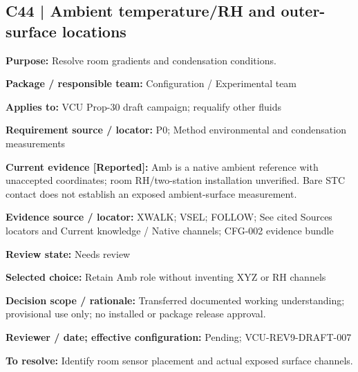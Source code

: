\documentclass[11pt]{article}
\begin{document}
\par\noindent\begin{minipage}{\textwidth}\small\setlength{\parskip}{2pt}
\subsection*{C44 | Ambient temperature/RH and outer-surface locations}
\textbf{Purpose:} Resolve room gradients and condensation conditions.\par
\textbf{Package / responsible team:} Configuration / Experimental team\par
\textbf{Applies to:} VCU Prop-30 draft campaign; requalify other fluids\par
\textbf{Requirement source / locator:} P0; Method environmental and condensation measurements\par
\textbf{Current evidence [Reported]:} Amb is a native ambient reference with unaccepted coordinates; room RH/two-station installation unverified. Bare STC contact does not establish an exposed ambient-surface measurement.\par
\textbf{Evidence source / locator:} XWALK; VSEL; FOLLOW; See cited Sources locators and Current knowledge / Native channels; CFG-002 evidence bundle\par
\textbf{Review state:} Needs review\par
\textbf{Selected choice:} Retain Amb role without inventing XYZ or RH channels\par
\textbf{Decision scope / rationale:} Transferred documented working understanding; provisional use only; no installed or package release approval.\par
\textbf{Reviewer / date; effective configuration:} Pending; VCU-REV9-DRAFT-007\par
\textbf{To resolve:} Identify room sensor placement and actual exposed surface channels.\par
\end{minipage}\par\vspace{5pt}
\end{document}
